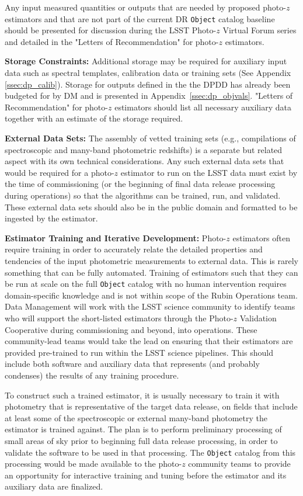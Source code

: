 \documentclass[DM,authoryear,toc]{lsstdoc}
\begin{document}
Any input measured quantities or outputs that are needed by proposed photo-$z$ estimators and that are not part of the current DR {\tt Object} catalog baseline should be presented for discussion during the LSST Photo-$z$ Virtual Forum series and detailed in the "Letters of Recommendation" for photo-$z$ estimators. 

\textbf{Storage Constraints:}
Additional storage may be required for auxiliary input data such as spectral templates, calibration data or training sets (See Appendix \ref{ssec:dp_calib}). 
Storage for outputs defined in the the DPDD \cite{LSE-163} has already been budgeted for by DM and is presented in Appendix~\ref{ssec:dp_objvals}. 
"Letters of Recommendation" for photo-$z$ estimators should list all necessary auxiliary data together with an estimate of the storage required.

\textbf{External Data Sets:}
The assembly of vetted training sets (e.g., compilations of spectroscopic and many-band photometric redshifts) is a separate but related aspect with its own technical considerations.
Any such external data sets that would be required for a photo-$z$ estimator to run on the LSST data must exist by the time of commissioning (or the beginning of final data release processing during operations) so that the algorithms can be trained, run, and validated.
These external data sets should also be in the public domain and formatted to be ingested by the estimator.

\textbf{Estimator Training and Iterative Development:}
Photo-$z$ estimators often require training in order to accurately relate the detailed properties and tendencies of the input photometric measurements to external data.
This is rarely something that can be fully automated.
Training of estimators such that they can be run at scale on the full {\tt Object} catalog with no human intervention requires domain-specific knowledge and is not within scope of the Rubin Operations team. 
Data Management will work with the LSST science community to identify teams who will support the short-listed estimators through the Photo-$z$ Validation Cooperative during commissioning and beyond, into operations.
These community-lead teams would take the lead on ensuring that their estimators are provided pre-trained to run within the LSST science pipelines. 
This should include both software and auxiliary data that represents (and probably condenses) the results of any training procedure.

To construct such a trained estimator, it is usually necessary to train it with photometry that is representative of the target data release, on fields that include at least some of the spectroscopic or external many-band photometry the estimator is trained against.
The plan is to perform preliminary processing of small areas of sky prior to beginning full data release processing, in order to validate the software to be used in that processing.
The {\tt Object} catalog from this processing would be made available to the photo-$z$ community teams to provide an opportunity for interactive training and tuning before the estimator and its auxiliary data are finalized.
\end{document}
